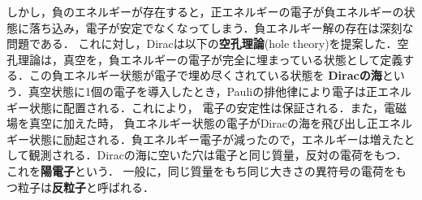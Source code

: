 \documentclass{report}
\begin{document}
しかし，負のエネルギーが存在すると，正エネルギーの電子が負エネルギーの状態に落ち込み，電子が安定でなくなってしまう．負エネルギー解の存在は深刻な問題である．
これに対し，Diracは以下の\textbf{空孔理論}(hole theory)を提案した．空孔理論は，真空を，負エネルギーの電子が完全に埋まっている状態として定義する．この負エネルギー状態が電子で埋め尽くされている状態を
\textbf{Diracの海}という．真空状態に1個の電子を導入したとき，Pauliの排他律により電子は正エネルギー状態に配置される．これにより，
電子の安定性は保証される．また，電磁場を真空に加えた時，
負エネルギー状態の電子がDiracの海を飛び出し正エネルギー状態に励起される．負エネルギー電子が減ったので，エネルギーは増えたとして観測される．Diracの海に空いた穴は電子と同じ質量，反対の電荷をもつ．これを\textbf{陽電子}という．
一般に，同じ質量をもち同じ大きさの異符号の電荷をもつ粒子は\textbf{反粒子}と呼ばれる．
\end{document}
